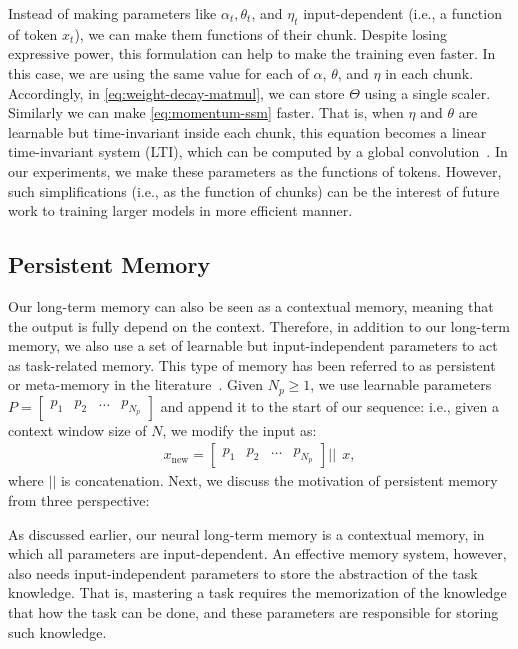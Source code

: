 \documentclass{article}
\newcommand{\citep}{\parencite}
\newcommand{\head}[1]{\vspace{1.7mm}\noindent{{\textcolor{c3}{\bf #1.}}}}
\begin{document}
\head{Parameters as the Function of Chunks}
Instead of making parameters like $\alpha_t, \theta_t$, and $\eta_t$ input-dependent (i.e., a function of token $x_t$), we can make them functions of their chunk. Despite losing expressive power, this formulation can help to make the training even faster. In this case, we are using the same value for each of $\alpha$, $\theta$, and $\eta$ in each chunk. Accordingly, in \autoref{eq:weight-decay-matmul}, we can store $\Theta$ using a single scaler. Similarly we can make \autoref{eq:momentum-ssm} faster. That is, when $\eta$ and $\theta$ are learnable but time-invariant inside each chunk, this equation becomes a linear time-invariant system (LTI), which can be computed by a global convolution~\citep{gu2022efficiently}. In our experiments, we make these parameters as the functions of tokens. However, such simplifications (i.e., as the function of chunks) can be the interest of future work to training larger models in more efficient manner.   

\subsection{Persistent Memory}\label{sec:persistent-memory}
Our long-term memory can also be seen as a contextual memory, meaning that the output is fully depend on the context. Therefore, in addition to our long-term memory, we also use a set of learnable but input-independent parameters to act as task-related memory. This type of memory has been referred to as persistent or meta-memory in the literature~\citep{sukhbaatar2019augmenting, dong2024hymba}. Given $N_p \geq 1$, we use learnable parameters $P = \begin{bmatrix}
    p_1 & p_2 & \dots & p_{N_p}
\end{bmatrix}$ and append it to the start of our sequence: i.e., given a context window size of $N$, we modify the input as:
\begin{align}
    x_{\text{new}} = \begin{bmatrix}
    p_1 & p_2 & \dots & p_{N_p}
\end{bmatrix} || \: \: x, 
\end{align}
where $||$ is concatenation. Next, we discuss the motivation of persistent memory from three perspective:

\head{Memory Perspective}
As discussed earlier, our neural long-term memory is a contextual memory, in which all parameters are input-dependent. An effective memory system, however, also needs input-independent parameters to store the abstraction of the task knowledge. That is, mastering a task requires the memorization of the knowledge that how the task can be done, and these parameters are responsible for storing such knowledge. 
\end{document}
